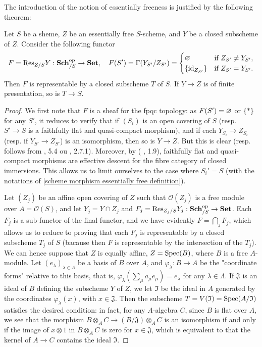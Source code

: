 The introduction of the notion of essentially freeness is justified by the following theorem:
\begin{theorem}\label{scheme Weil restriction of closed of essentialy free representable prop}
Let $S$ be a sheme, $Z$ be an essentially free $S$-scheme, and $Y$ be a closed subscheme of $Z$. Consider the following functor
\[F=\mathrm{Res}_{Z/S}Y:\mathbf{Sch}_{/S}^{\mathrm{op}}\to\mathbf{Set},\quad F(S')=\Gamma(Y_{S'}/Z_{S'})=\begin{cases}
\varnothing&\text{if $Z_{S'}\neq Y_{S'}$},\\
\{\operatorname{id}_{Z_{S'}}\}&\text{if $Z_{S'}=Y_{S'}$}.
\end{cases}\]
Then $F$ is representable by a closed subscheme $T$ of $S$. If $Y\to Z$ is of finite presentation, so is $T\to S$.
\end{theorem}
\begin{proof}
We first note that $F$ is a sheaf for the fpqc topology: as $F(S')=\varnothing$ or $\{\ast\}$ for any $S'$, it reduces to verify that if $(S_i)$ is an open covering of $S$ (resp. $S'\to S$ is a faithfully flat and quasi-compact morphism), and if each $Y_{S_i}\to Z_{S_i}$ (resp. if $Y_{S'}\to Z_{S'}$) is an isomorphism, then so is $Y\to Z$. But this is clear (resp. follows from \cite{SGA1} , 5.4 ou \cite{EGA4-2}, 2.7.1). Moreover, by (\cite{SGA1} , 1.9), faithfully flat and quasi-compact morphisms are effective descent for the fibre category of closed immersions. This allows us to limit ourselves to the case where $S_i'=S$ (with the notations of \cref{scheme morphism essentially free definition}).\par
Let $(Z_j)$ be an affine open covering of $Z$ such that $\mathscr{O}(Z_j)$ is a free module over $A=\mathscr{O}(S)$, and let $Y_j=Y\cap Z_j$ and $F_j=\mathrm{Res}_{Z_j/S}Y_j:\mathbf{Sch}_{/S}^{\mathrm{op}}\to\mathbf{Set}$. Each $F_j$ is a sub-functor of the final functor, and we have evidently $F=\bigcap_jF_j$, which allows us to reduce to proving that each $F_j$ is representable by a closed subscheme $T_j$ of $S$ (bacause then $F$ is representable by the intersection of the $T_j$). We can hence suppose that $Z$ is equally affine, $Z=\mathrm{Spec}(B)$, where $B$ is a free $A$-module. Let $(e_\lambda)_{\lambda\in\Lambda}$ be a basis of $B$ over $A$, and $\varphi_\lambda:B\to A$ be the "coordinate forms" relative to this basis, that is, $\varphi_\lambda(\sum_\mu a_\mu e_\mu)=e_\lambda$ for any $\lambda\in\Lambda$. If $\mathfrak{J}$ is an ideal of $B$ defining the subscheme $Y$ of $Z$, we let $\mathfrak{I}$ be the ideal in $A$ generated by the coordinates $\varphi_\lambda(x)$, with $x\in\mathfrak{J}$. Then the subscheme $T=V(\mathfrak{I})=\mathrm{Spec}(A/\mathfrak{I})$ satisfies the desired condition: in fact, for any $A$-algebra $C$, since $B$ is flat over $A$, we see that the morphism $B\otimes_AC\to(B/\mathfrak{J})\otimes_AC$ is an isomorphism if and only if the image of $x\otimes 1$ in $B\otimes_AC$ is zero for $x\in\mathfrak{J}$, which is equivalent to that the kernel of $A\to C$ contains the ideal $\mathfrak{I}$.
\end{proof}

